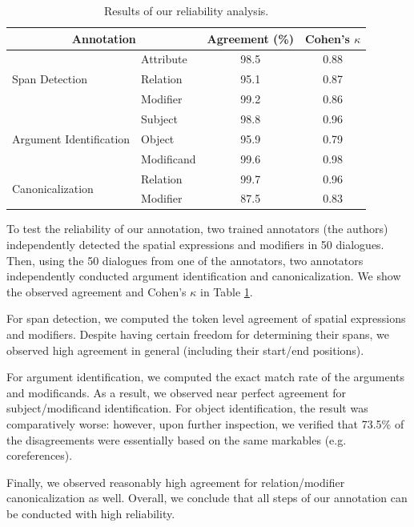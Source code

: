 \begin{table}[ht]
\centering \small
\setlength{\tabcolsep}{9pt}
\setlength{\aboverulesep}{0pt}
\setlength{\belowrulesep}{0pt}
\setlength{\extrarowheight}{.75ex}
\begin{tabular}{ll|cc}
\toprule
\multicolumn{2}{c|}{Annotation} & Agreement (\%) & Cohen's $\kappa$ \\
\midrule
\multirow{3}{*}{Span Detection} & Attribute & 98.5 & 0.88 \\
& Relation & 95.1 & 0.87 \\
& Modifier & 99.2 & 0.86 \\
\midrule
\multirow{3}{*}{\parbox{2cm}{Argument Identification}} & Subject & 98.8 & 0.96 \\
& Object & 95.9 & 0.79 \\
& Modificand & 99.6 & 0.98 \\
\midrule
\multirow{2}{*}{Canonicalization} & Relation & 99.7 & 0.96 \\
& Modifier & 87.5 & 0.83 \\
\bottomrule
\end{tabular}
\caption{
Results of our reliability analysis.
}
\label{05_tab:reliability_results}
\end{table}

To test the reliability of our annotation, two trained annotators (the authors) independently detected the spatial expressions and modifiers in 50 dialogues. Then, using the 50 dialogues from one of the annotators, two annotators independently conducted argument identification and canonicalization. We show the observed agreement and Cohen's $\kappa$ \citep{cohen1968weighted} in Table \ref{05_tab:reliability_results}.

For span detection, we computed the token level agreement of spatial expressions and modifiers. Despite having certain freedom for determining their spans, we observed high agreement in general (including their start/end positions).

For argument identification, we computed the exact match rate of the arguments and modificands. As a result, we observed near perfect agreement for subject/modificand identification. For object identification, the result was comparatively worse: however, upon further inspection, we verified that 73.5\% of the disagreements were essentially based on the same markables (e.g. coreferences).

Finally, we observed reasonably high agreement for relation/modifier canonicalization as well. Overall, we conclude that all steps of our annotation can be conducted with high reliability.

